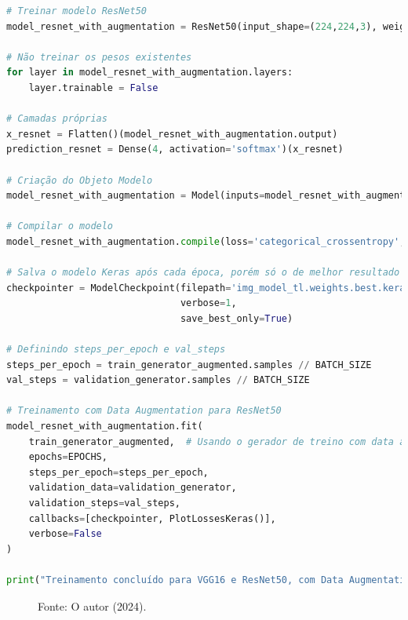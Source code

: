 \begin{lstlisting}[language=Python, style=input]
# Treinar modelo ResNet50
model_resnet_with_augmentation = ResNet50(input_shape=(224,224,3), weights='imagenet', include_top=False)

# Não treinar os pesos existentes
for layer in model_resnet_with_augmentation.layers:
    layer.trainable = False

# Camadas próprias
x_resnet = Flatten()(model_resnet_with_augmentation.output)
prediction_resnet = Dense(4, activation='softmax')(x_resnet)

# Criação do Objeto Modelo
model_resnet_with_augmentation = Model(inputs=model_resnet_with_augmentation.input, outputs=prediction_resnet)

# Compilar o modelo
model_resnet_with_augmentation.compile(loss='categorical_crossentropy', optimizer=RMSprop(learning_rate=0.0001), metrics=['accuracy'])

# Salva o modelo Keras após cada época, porém só o de melhor resultado
checkpointer = ModelCheckpoint(filepath='img_model_tl.weights.best.keras',
                               verbose=1,
                               save_best_only=True)

# Definindo steps_per_epoch e val_steps
steps_per_epoch = train_generator_augmented.samples // BATCH_SIZE
val_steps = validation_generator.samples // BATCH_SIZE

# Treinamento com Data Augmentation para ResNet50
model_resnet_with_augmentation.fit(
    train_generator_augmented,  # Usando o gerador de treino com data augmentation
    epochs=EPOCHS,
    steps_per_epoch=steps_per_epoch,
    validation_data=validation_generator,
    validation_steps=val_steps,
    callbacks=[checkpointer, PlotLossesKeras()],
    verbose=False
)

print("Treinamento concluído para VGG16 e ResNet50, com Data Augmentation.")
\end{lstlisting}
\begin{figure}[h!]
\centering
\caption{Acurácia e perda ResNet50 com data augmentation}
\hspace*{-2cm} %
\caption*{Fonte: O autor (2024).}
\end{figure}

